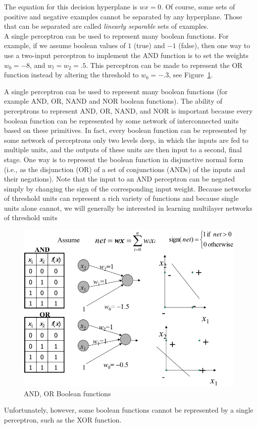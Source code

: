 \documentclass[../main.tex]{subfiles}
\begin{document}
The equation for this decision hyperplane is $wx = 0$. Of course, some sets of positive and negative examples cannot be separated by any hyperplane. Those that can be separated are called \textit{linearly separable} sets of examples.\\

A single perceptron can be used to represent many boolean functions. For example, if we assume boolean values of $1$ (true) and $-1$ (false), then one way to use a two-input perceptron to implement the AND function is to set the weights $w_0 = -8$, and $w_l = w_2 = .5$. This perceptron can be made to represent the OR function instead by altering the threshold to $w_0 = -.3$, see Figure~\ref{fig:4_boolean_functions}.

A single perceptron can be used to represent many boolean functions (for example AND, OR, NAND and NOR boolean functions). The ability of perceptrons to represent AND, OR, NAND, and NOR is important because every boolean function can be represented by some network of interconnected units based on these primitives. In fact, every boolean function can be represented by some network of perceptrons only two levels deep, in which the inputs are fed to multiple units, and the outputs of these units are then input to a second, final stage. One way is to represent the boolean function in disjunctive normal form (i.e., as the disjunction (OR) of a set of conjunctions (ANDs) of the inputs and their negations). Note that the input to an AND perceptron can be negated simply by changing the sign of the corresponding input weight. Because networks of threshold units can represent a rich variety of functions and because single units alone cannot, we will generally be interested in learning multilayer networks of threshold units
\begin{figure}[H]
    \centering
    \includegraphics[scale = 0.3]{lectures/4_neural_networks/4_boolean_functions.png}
    \caption{AND, OR Boolean functions}
    \label{fig:4_boolean_functions}
\end{figure}
\noindent Unfortunately, however, some boolean functions cannot be represented by a single perceptron, such as the XOR function.
\end{document}
